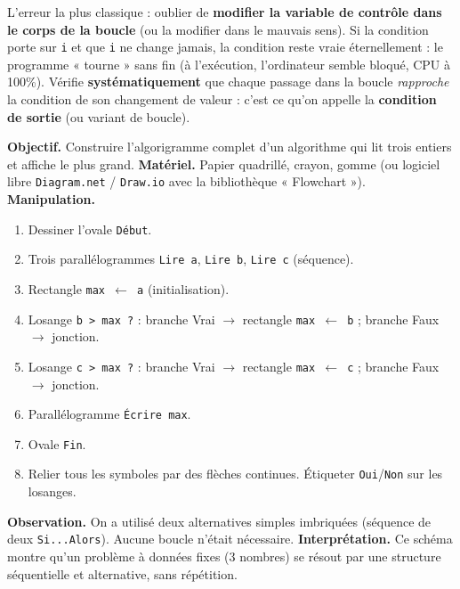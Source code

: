 \documentclass[11pt]{article}
\begin{document}
\begin{attention}
L'erreur la plus classique : oublier de \textbf{modifier la variable de contrôle dans le corps de la boucle} (ou la modifier dans le mauvais sens). Si la condition porte sur \texttt{i} et que \texttt{i} ne change jamais, la condition reste vraie éternellement : le programme « tourne » sans fin (à l'exécution, l'ordinateur semble bloqué, CPU à 100\%). Vérifie \textbf{systématiquement} que chaque passage dans la boucle \emph{rapproche} la condition de son changement de valeur : c'est ce qu'on appelle la \textbf{condition de sortie} (ou variant de boucle).
\end{attention}

\begin{experience}
\textbf{Objectif.} Construire l'algorigramme complet d'un algorithme qui lit trois entiers et affiche le plus grand.
\textbf{Matériel.} Papier quadrillé, crayon, gomme (ou logiciel libre \texttt{Diagram.net} / \texttt{Draw.io} avec la bibliothèque « Flowchart »).
\textbf{Manipulation.}
\begin{enumerate}
\item Dessiner l'ovale \texttt{Début}.
\item Trois parallélogrammes \texttt{Lire a}, \texttt{Lire b}, \texttt{Lire c} (séquence).
\item Rectangle \texttt{max $\leftarrow$ a} (initialisation).
\item Losange \texttt{b > max ?} : branche Vrai $\to$ rectangle \texttt{max $\leftarrow$ b} ; branche Faux $\to$ jonction.
\item Losange \texttt{c > max ?} : branche Vrai $\to$ rectangle \texttt{max $\leftarrow$ c} ; branche Faux $\to$ jonction.
\item Parallélogramme \texttt{Écrire max}.
\item Ovale \texttt{Fin}.
\item Relier tous les symboles par des flèches continues. Étiqueter \texttt{Oui}/\texttt{Non} sur les losanges.
\end{enumerate}
\textbf{Observation.} On a utilisé deux alternatives simples imbriquées (séquence de deux \texttt{Si...Alors}). Aucune boucle n'était nécessaire.
\textbf{Interprétation.} Ce schéma montre qu'un problème à données fixes (3 nombres) se résout par une structure séquentielle et alternative, sans répétition.
\end{experience}
\end{document}
